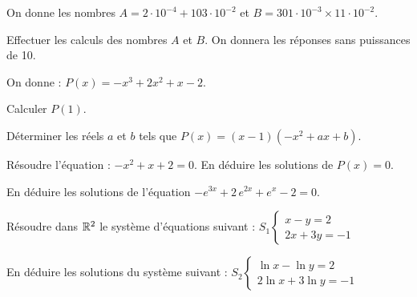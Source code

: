 \documentclass[11pt]{article}
\begin{document}

On donne les nombres $A = 2\cdot 10^{-4} + 103\cdot 10^{-2}$ et $B = 301\cdot 10^{-3} \times 11\cdot 10^{-2}$.
\begin{questions}
  \item Effectuer les calculs des nombres $A$ et $B$. On donnera les réponses sans puissances de 10.
  \item On donne : $P(x) = -x^3 + 2x^2 + x - 2$.
  \begin{sousq}
    \item Calculer $P(1)$.
    \item Déterminer les réels $a$ et $b$ tels que $P(x) = (x - 1)(-x^2 + ax + b)$.
    \item Résoudre l'équation : $-x^2 + x + 2 = 0$. En déduire les solutions de $P(x) = 0$.
    \item En déduire les solutions de l'équation $-e^{3x} + 2\,e^{2x} + e^{x} - 2 = 0$.
  \end{sousq}
  \item Résoudre dans $\mathbb{R}^2$ le système d'équations suivant : $S_1 \begin{cases} x - y = 2 \\ 2x + 3y = -1 \end{cases}$

  En déduire les solutions du système suivant : $S_2 \begin{cases} \ln x - \ln y = 2 \\ 2\ln x + 3\ln y = -1 \end{cases}$
\end{questions}
\end{document}
